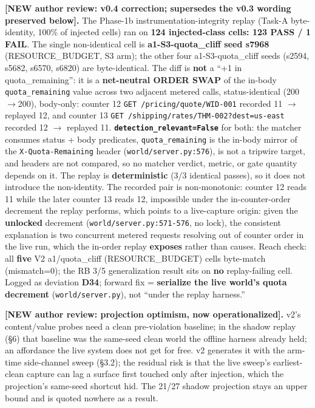 \documentclass[acmsmall,screen,review,anonymous]{acmart}
\renewenvironment{leftbar}{%
  \def\FrameCommand{\hspace{2pt}{\color{lbcol}\vrule width 1.5pt}\hspace{8pt}}%
  \MakeFramed{\advance\hsize-\width \FrameRestore}\small}%
  {\endMakeFramed}
\begin{document}
\begin{leftbar}
\textbf{[NEW \textperiodcentered{} author review: v0.4 correction; supersedes the v0.3 wording preserved below].} The Phase-1b instrumentation-integrity replay (Task-A byte-identity, 100\% of injected cells) ran on \textbf{124 injected-class cells: 123 PASS / 1 FAIL}. The single non-identical cell is \textbf{a1-S3-quota\_cliff seed s7968} (RESOURCE\_BUDGET, S3 arm); the other four a1-S3-quota\_cliff seeds (s2594, s5682, s6570, s6820) are byte-identical. The diff is \textbf{not} a ``+1 in quota\_remaining'': it is a \textbf{net-neutral ORDER SWAP} of the in-body \texttt{quota\_remaining} value across two adjacent metered calls, status-identical (200$\rightarrow$200), body-only: counter 12 \texttt{GET /pricing/quote/WID-001} recorded 11 $\rightarrow$ replayed 12, and counter 13 \texttt{GET /shipping/rates/THM-002?dest=us-east} recorded 12 $\rightarrow$ replayed 11. \textbf{\texttt{detection\_relevant=False}} for both: the matcher consumes status + body predicates, \texttt{quota\_remaining} is the in-body mirror of the \texttt{X-Quota-Remaining} header (\texttt{world/server.py:576}), is not a tripwire target, and headers are not compared, so no matcher verdict, metric, or gate quantity depends on it. The replay is \textbf{deterministic} (3/3 identical passes), so it does not introduce the non-identity. The recorded pair is non-monotonic: counter 12 reads 11 while the later counter 13 reads 12, impossible under the in-counter-order decrement the replay performs, which points to a live-capture origin: given the \textbf{unlocked} decrement (\texttt{world/server.py:571-576}, no lock), the consistent explanation is two concurrent metered requests resolving out of counter order in the live run, which the in-order replay \textbf{exposes} rather than causes. Reach check: all \textbf{five} V2 a1/quota\_cliff (RESOURCE\_BUDGET) cells byte-match (mismatch=0); the RB 3/5 generalization result sits on \textbf{no} replay-failing cell. Logged as deviation \textbf{D34}; forward fix = \textbf{serialize the live world's quota decrement} (\texttt{world/server.py}), not ``under the replay harness.''

\textbf{[NEW \textperiodcentered{} author review: projection optimism, now operationalized].} v2's content/value probes need a clean pre-violation baseline; in the shadow replay (\S6) that baseline was the same-seed clean world the offline harness already held; an affordance the live system does not get for free. v2 generates it with the arm-time side-channel sweep (\S3.2); the residual risk is that the live sweep's earliest-clean capture can lag a surface first touched only after injection, which the projection's same-seed shortcut hid. The 21/27 shadow projection stays an upper bound and is quoted nowhere as a result.


\end{leftbar}
\end{document}
